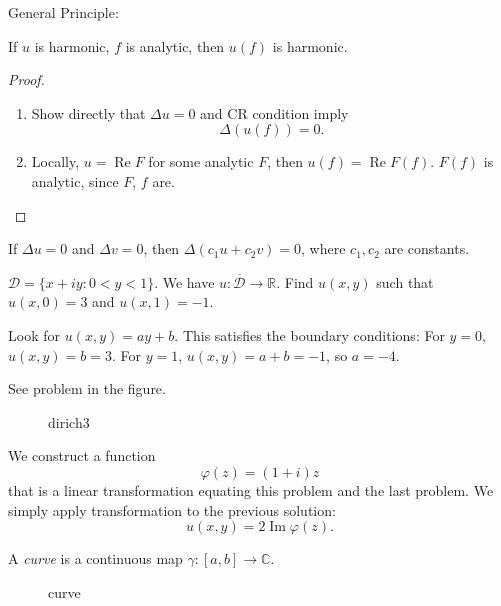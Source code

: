 
General Principle:
\begin{theorem}
	If $u$ is harmonic, $f$ is analytic, then $u(f)$ is harmonic.
\end{theorem}
\begin{proof}
	\begin{enumerate}
		\item Show directly that $\Delta u =0$ and CR condition imply \[
			\Delta \left( u(f) \right)  = 0
		.\] 
	\item Locally, $u = \operatorname{Re}  F$ for some analytic $F$, then $u(f) = \operatorname{Re} F(f)$. $F(f)$ is analytic, since $F$, $f$ are.
	\end{enumerate}
\end{proof}

\begin{theorem}
	If $\Delta u =0$ and $\Delta v =0$, then $\Delta\left( c_1 u + c_2 v \right) =0$, where $c_1, c_2$ are constants.
\end{theorem}

\begin{example}
	$\mathcal{D} = \{x+iy:0<y<1\} $. We have $u: \overline{\mathcal{D}} \to \mathbb{R}$. Find $u(x,y)$ such that $u(x,0) = 3$ and $u(x,1) = -1$.

	Look for $u(x,y) = a y + b$. This satisfies the boundary conditions: For $y = 0$, $u(x,y) = b = 3$. For  $y = 1$, $u(x,y) = a+b = -1$, so $a = -4$.
\end{example}

\begin{example}
	See problem in the figure.
\begin{figure}[H]
    \centering
    \caption{dirich3}
    \label{fig:dirich3}
\end{figure}
	We construct a function \[
		\varphi(z) = (1+i)z
	\] 
	that is a linear transformation equating this problem and the last problem. We simply apply transformation to the previous solution:
	 \[
		u(x,y) = 2 \operatorname{Im} \varphi(z)
	.\] 
\end{example}

\begin{definition}
	A \textit{curve} is a continuous map $\gamma : [a,b] \to  \mathbb{C}$.
\end{definition}
\begin{figure}[ht]
    \centering
    \caption{curve}
    \label{fig:curve}
\end{figure}


